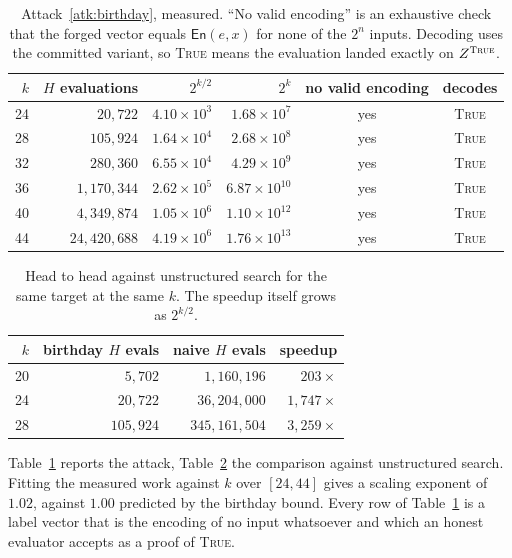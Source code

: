 \documentclass[11pt,a4paper]{article}
\theoremstyle{definition}
\theoremstyle{plain}
\newcommand{\En}{\mathsf{En}}
\newcommand{\Hh}{H}
\begin{document}
\begin{table}[t]
\centering
\begin{tabular}{rrrrcc}
\toprule
$k$ & $\Hh$ evaluations & $2^{k/2}$ & $2^{k}$ & no valid encoding & decodes \\
\midrule
24 & $20{,}722$ & $4.10\!\times\!10^{3}$ & $1.68\!\times\!10^{7}$ & yes & \textsc{True} \\
28 & $105{,}924$ & $1.64\!\times\!10^{4}$ & $2.68\!\times\!10^{8}$ & yes & \textsc{True} \\
32 & $280{,}360$ & $6.55\!\times\!10^{4}$ & $4.29\!\times\!10^{9}$ & yes & \textsc{True} \\
36 & $1{,}170{,}344$ & $2.62\!\times\!10^{5}$ & $6.87\!\times\!10^{10}$ & yes & \textsc{True} \\
40 & $4{,}349{,}874$ & $1.05\!\times\!10^{6}$ & $1.10\!\times\!10^{12}$ & yes & \textsc{True} \\
44 & $24{,}420{,}688$ & $4.19\!\times\!10^{6}$ & $1.76\!\times\!10^{13}$ & yes & \textsc{True} \\
\bottomrule
\end{tabular}
\caption{Attack~\ref{atk:birthday}, measured. ``No valid encoding'' is an
exhaustive check that the forged vector equals $\En(e,x)$ for none of the $2^{n}$
inputs. Decoding uses the committed variant, so \textsc{True} means the
evaluation landed exactly on $Z^{\textsc{True}}$.}
\label{tab:birthday}
\end{table}

\begin{table}[t]
\centering
\begin{tabular}{rrrr}
\toprule
$k$ & birthday $\Hh$ evals & naive $\Hh$ evals & speedup \\
\midrule
20 & $5{,}702$ & $1{,}160{,}196$ & $203\times$ \\
24 & $20{,}722$ & $36{,}204{,}000$ & $1{,}747\times$ \\
28 & $105{,}924$ & $345{,}161{,}504$ & $3{,}259\times$ \\
\bottomrule
\end{tabular}
\caption{Head to head against unstructured search for the same target at the
same $k$. The speedup itself grows as $2^{k/2}$.}
\label{tab:headtohead}
\end{table}

Table~\ref{tab:birthday} reports the attack, Table~\ref{tab:headtohead} the
comparison against unstructured search. Fitting the measured work against $k$
over $[24,44]$ gives a scaling exponent of $\mathbf{1.02}$, against $1.00$
predicted by the birthday bound. Every row of Table~\ref{tab:birthday} is a
label vector that is the encoding of no input whatsoever and which an honest
evaluator accepts as a proof of \textsc{True}.
\end{document}
